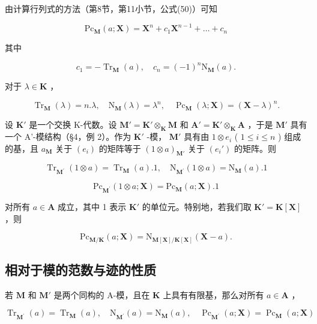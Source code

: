 由计算行列式的方法（第8节，第11小节，公式(50)）可知

\[
\mathrm{Pc} _ {\mathbf {M}} (a; \mathbf {X}) = \mathbf {X} ^ {n} + c _ {1} \mathbf {X} ^ {n - 1} + \dots + c _ {n}\tag{7}
\]

其中

\[
c _ {1} = - \operatorname{Tr} _ {\mathbf {M}} (a), \quad c _ {n} = (- 1) ^ {n} \mathrm{N} _ {\mathbf {M}} (a).\tag{8}
\]

对于 \(\lambda \in \mathbf{K}\) ，

\[
\operatorname{Tr} _ {\mathbf {M}} (\lambda) = n. \lambda , \quad \mathrm{N} _ {\mathbf {M}} (\lambda) = \lambda^ {n}, \quad \operatorname{Pc} _ {\mathbf {M}} (\lambda ; \mathbf {X}) = (\mathbf {X} - \lambda) ^ {n}.\tag{9}
\]

设 \(\mathbf{K}'\) 是一个交换 K-代数。设 \(\mathbf{M}' = \mathbf{K}' \otimes_{\mathbf{K}} \mathbf{M}\) 和 \(\mathbf{A}' = \mathbf{K}' \otimes_{\mathbf{K}} \mathbf{A}\) ，于是 \(\mathbf{M}'\) 具有一个 A'-模结构（§4，例 2）。作为 \(\mathbf{K}'\) -模， \(\mathbf{M}'\) 具有由 \(1 \otimes e_i\) ( \(1 \leqslant i \leqslant n\) ) 组成的基，且 \(a_{\mathbf{M}}\) 关于 \((e_i)\) 的矩阵等于 \((1 \otimes a)_{\mathbf{M}'}\) 关于 \((e_i')\) 的矩阵。则

\[
\operatorname{Tr} _ {\mathbf {M} ^ {\prime}} (1 \otimes a) = \operatorname{Tr} _ {\mathbf {M}} (a). 1, \quad \mathrm{N} _ {\mathbf {M} ^ {\prime}} (1 \otimes a) = \mathrm{N} _ {\mathbf {M}} (a). 1\tag{12}
\]

\[
\mathrm{Pc} _ {\mathbf {M} ^ {\prime}} (1 \otimes a; \mathbf {X}) = \mathrm{Pc} _ {\mathbf {M}} (a; \mathbf {X}). 1
\]

对所有 \(a \in \mathbf{A}\) 成立，其中 1 表示 \(\mathbf{K}'\) 的单位元。特别地，若我们取 \(\mathbf{K}' = \mathbf{K}[\mathbf{X}]\) ，则

\[
\mathrm{Pc} _ {\mathbf {M} / \mathbf {K}} (a; \mathbf {X}) = \mathrm{N} _ {\mathbf {M} [ \mathbf {X} ] / \mathbf {K} [ \mathbf {X} ]} (\mathbf {X} - a).\tag{13}
\]

\subsection{相对于模的范数与迹的性质}

若 \(\mathbf{M}\) 和 \(\mathbf{M}'\) 是两个同构的 A-模，且在 \(\mathbf{K}\) 上具有有限基，那么对所有 \(a \in \mathbf{A}\) ，

\[
\operatorname{Tr} _ {\mathbf {M} ^ {\prime}} (a) = \operatorname{Tr} _ {\mathbf {M}} (a), \quad \mathrm{N} _ {\mathbf {M} ^ {\prime}} (a) = \mathrm{N} _ {\mathbf {M}} (a), \quad \operatorname{Pc} _ {\mathbf {M} ^ {\prime}} (a; \mathbf {X}) = \operatorname{Pc} _ {\mathbf {M}} (a; \mathbf {X})\tag{14}
\]

